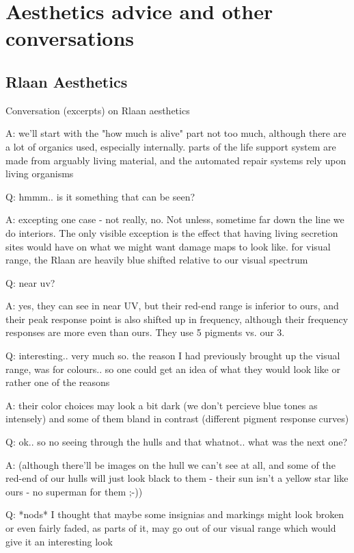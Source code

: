 \label{chapt:uncategorized}

\section{Aesthetics advice and other conversations}

\subsection{Rlaan Aesthetics}
Conversation (excerpts) on Rlaan aesthetics

A: we'll start with the "how much is alive" part not too much,
although there are a lot of organics used, especially internally.
parts of the life support system are made from arguably living
material, and the automated repair systems rely upon living organisms

Q: hmmm.. is it something that can be seen?

A: excepting one case - not really, no. Not unless, sometime far down
the line we do interiors. The only visible exception is the effect
that having living secretion sites would have on what we might want
damage maps to look like. for visual range, the Rlaan are heavily blue
shifted relative to our visual spectrum

Q: near uv?

A: yes, they can see in near UV, but their red-end range is inferior
to ours, and their peak response point is also shifted up in
frequency, although their frequency responses are more even than
ours. They use 5 pigments vs. our 3.

Q: interesting.. very much so. the reason I had previously brought up
the visual range, was for colours.. so one could get an idea of what
they would look like or rather one of the reasons

A: their color choices may look a bit dark (we don't percieve blue
tones as intensely) and some of them bland in contrast (different
pigment response curves)

Q: ok.. so no seeing through the hulls and that whatnot.. what was the
next one?

A: (although there'll be images on the hull we can't see at all, and
some of the red-end of our hulls will just look black to them - their
sun isn't a yellow star like ours - no superman for them ;-))

Q: *nods* I thought that maybe some insignias and markings might look
broken or even fairly faded, as parts of it, may go out of our visual
range which would give it an interesting look

